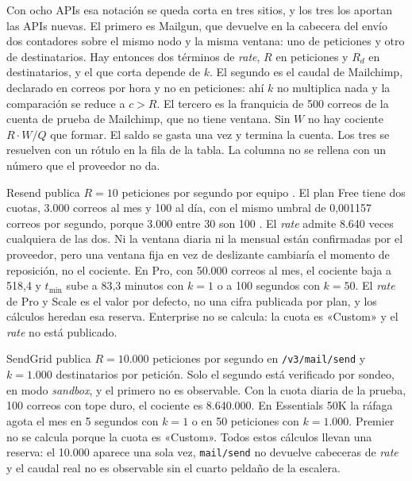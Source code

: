 Con ocho APIs esa notación se queda corta en tres sitios, y los tres los aportan las APIs nuevas.
El primero es Mailgun, que devuelve en la cabecera del envío dos contadores sobre el mismo nodo y la misma ventana: uno de peticiones y otro de destinatarios.
Hay entonces dos términos de \textit{rate}, $R$ en peticiones y $R_d$ en destinatarios, y el que corta depende de $k$.
El segundo es el caudal de Mailchimp, declarado en correos por hora y no en peticiones: ahí $k$ no multiplica nada y la comparación se reduce a $c > R$.
El tercero es la franquicia de 500 correos de la cuenta de prueba de Mailchimp, que no tiene ventana.
Sin $W$ no hay cociente $R \cdot W / Q$ que formar.
El saldo se gasta una vez y termina la cuenta.
Los tres se resuelven con un rótulo en la fila de la tabla.
La columna no se rellena con un número que el proveedor no da.

Resend publica $R = 10$ peticiones por segundo por equipo \citep{resenddocs}.
El plan Free tiene dos cuotas, 3.000 correos al mes y 100 al día, con el mismo umbral de 0,001157 correos por segundo, porque 3.000 entre 30 son 100 \citep{resendpricing}.
El \textit{rate} admite 8.640 veces cualquiera de las dos.
Ni la ventana diaria ni la mensual están confirmadas por el proveedor, pero una ventana fija en vez de deslizante cambiaría el momento de reposición, no el cociente.
En Pro, con 50.000 correos al mes, el cociente baja a 518,4 y $t_{\min}$ sube a 83,3 minutos con $k = 1$ o a 100 segundos con $k = 50$.
El \textit{rate} de Pro y Scale es el valor por defecto, no una cifra publicada por plan, y los cálculos heredan esa reserva.
Enterprise no se calcula: la cuota es «Custom» y el \textit{rate} no está publicado.

SendGrid publica $R = 10.000$ peticiones por segundo en \texttt{/v3/mail/send} y $k = 1.000$ destinatarios por petición.
Solo el segundo está verificado por sondeo, en modo \textit{sandbox}, y el primero no es observable.
Con la cuota diaria de la prueba, 100 correos con tope duro, el cociente es 8.640.000.
En Essentials 50K la ráfaga agota el mes en 5 segundos con $k = 1$ o en 50 peticiones con $k = 1.000$.
Premier no se calcula porque la cuota es «Custom».
Todos estos cálculos llevan una reserva: el 10.000 aparece una sola vez, \texttt{mail/send} no devuelve cabeceras de \textit{rate} y el caudal real no es observable sin el cuarto peldaño de la escalera.

